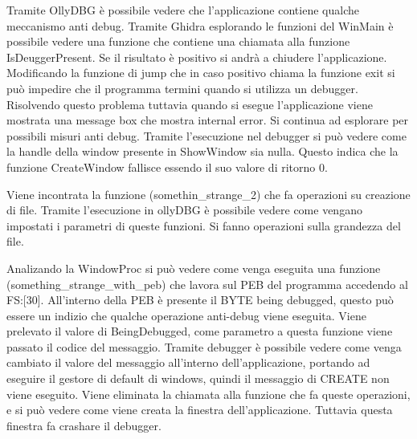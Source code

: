 \documentclass[a4paper,10pt]{article}
\begin{document}
Tramite OllyDBG è possibile vedere che l'applicazione contiene qualche meccanismo anti debug. Tramite Ghidra esplorando le funzioni del WinMain è possibile vedere una funzione che contiene una chiamata alla funzione IsDeuggerPresent. Se il risultato è positivo si andrà a chiudere l'applicazione. Modificando la funzione di jump che in caso positivo chiama la funzione exit si può impedire che il programma termini quando si utilizza un debugger.
Risolvendo questo problema tuttavia quando si esegue l'applicazione viene mostrata una message box che mostra internal error. Si continua ad esplorare per possibili misuri anti debug. Tramite l'esecuzione nel debugger si può vedere come la handle della window presente in ShowWindow sia nulla. Questo indica che la funzione CreateWindow fallisce essendo il suo valore di ritorno 0.

Viene incontrata la funzione (somethin\_strange\_2) che fa operazioni su creazione di file. Tramite l'esecuzione in ollyDBG è possibile vedere come vengano impostati i parametri di queste funzioni. Si fanno operazioni sulla grandezza del file.

Analizando la WindowProc si può vedere come venga eseguita una funzione (something\_strange\_with\_peb) che lavora sul PEB del programma accedendo al FS:[30]. All'interno della PEB è presente il BYTE being debugged, questo può essere un indizio che qualche operazione anti-debug viene eseguita. Viene prelevato il valore di BeingDebugged, come parametro a questa funzione viene passato il codice del messaggio. Tramite debugger è possibile vedere come venga cambiato il valore del messaggio all'interno dell'applicazione, portando ad eseguire il gestore di default di windows, quindi il messaggio di CREATE non viene eseguito. Viene eliminata la chiamata alla funzione che fa queste operazioni, e si può vedere come viene creata la finestra dell'applicazione. Tuttavia questa finestra fa crashare il debugger.
\end{document}
